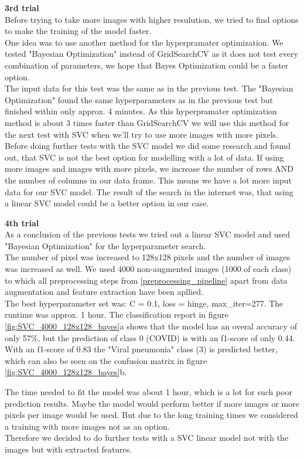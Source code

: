 \documentclass{article}
\begin{document}
\textbf{3rd trial }\\
Before trying to take more images with higher resulution, we tried to find options to make the training of the model faster.\\
One idea was to use another method for the hyperpramater optimization. We tested "Bayesian Optimization" instead of GridSearchCV as it does not test every 
combination of parameters, we hope that Bayes Optimization could be a faster option.\\
The input data for this test was the same as in the previous test. The "Bayesian Optimization" found the same hyperparameters as in the previous test but finished 
within only approx. 4 minutes. As this hyperpramater optimization method is about 3 times faster than GridSearchCV we will use this method for the next test with SVC 
when we'll try to use more images with more pixels. \\
Before doing further tests with the SVC model we did some research and found out, that SVC is not the best option for modelling with a lot of data. 
If using more images and images with more pixels, we increase the number of rows AND the number of columns in our data frame. This means we have a lot more input
data for our SVC model. The result of the search in the internet was, that using a linear SVC model could be a better option in our case. 

\textbf{4th trial }\\
As a conclusion of the previous tests we tried out a linear SVC model and used "Bayesian Optimization" for the hyperparameter search.\\
The number of pixel was increased to 128x128 pixels and the number of images was increased as well. We used 4000 non-augmented images (1000 of each class) to  which all
preprocessing steps from \ref{preprocessing_pipeline} apart from data augmentation and feature extraction have been apllied. \\

The best hyperparameter set was: C = 0.1,  loss = hinge, max\_iter=277. The runtime was approx. 1 hour. The classification report in figure 
\ref{fig:SVC_4000_128x128_bayes}a shows that the model has an overal accuracy of only  57\%, but the prediction of class 0 (COVID) is  with an f1-score of 
only 0.44. With an f1-score of 0.83 the "Viral pneumonia" class (3) is predicted better, which can also be seen on the confusion matrix in figure 
\ref{fig:SVC_4000_128x128_bayes}b.

The time needed to fit the model was about 1 hour, which is a lot for such poor prediction results. Maybe the model would perform better if more images or more pixels 
per image would be used. But due to the long training times we considered a training with more images not as an option.\\
Therefore we decided to do further tests with a SVC linear model not with the images but with extracted features.\\
\end{document}

